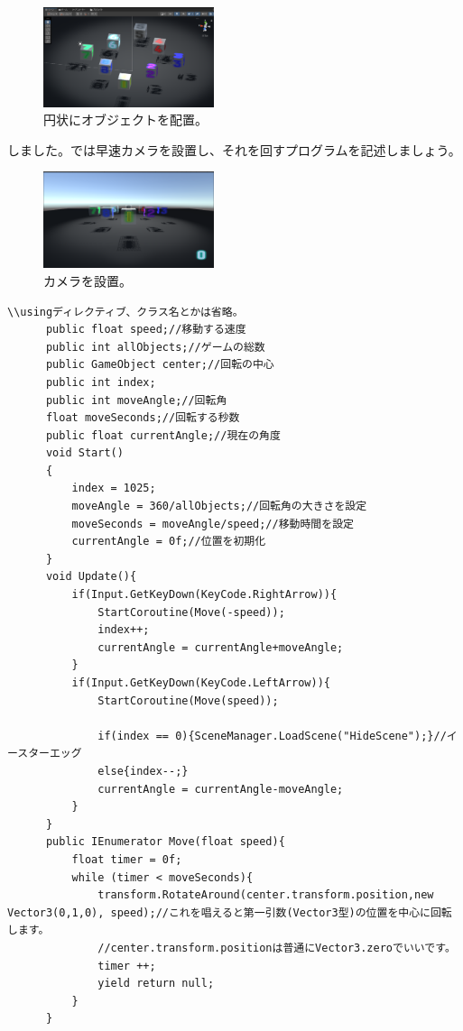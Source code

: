 \documentclass[b5paper,9pt,platex,dvipdfmx]{jsarticle}
\begin{document}
\begin{multicols}{3}
\begin{figure}[H]
  \centering
  \includegraphics[width=5cm]{2.png}
  \caption{円状にオブジェクトを配置。}
\end{figure}
しました。では早速カメラを設置し、それを回すプログラムを記述しましょう。\\
\begin{figure}[H]
  \centering
  \includegraphics[width=5cm]{3.png}
  \caption{カメラを設置。}
\end{figure}
\begin{lstlisting}[caption=MoveNext.cs]
\\usingディレクティブ、クラス名とかは省略。
      public float speed;//移動する速度
      public int allObjects;//ゲームの総数
      public GameObject center;//回転の中心
      public int index;
      public int moveAngle;//回転角
      float moveSeconds;//回転する秒数
      public float currentAngle;//現在の角度
      void Start()
      {
          index = 1025;
          moveAngle = 360/allObjects;//回転角の大きさを設定
          moveSeconds = moveAngle/speed;//移動時間を設定
          currentAngle = 0f;//位置を初期化
      }
      void Update(){
          if(Input.GetKeyDown(KeyCode.RightArrow)){
              StartCoroutine(Move(-speed));
              index++;
              currentAngle = currentAngle+moveAngle;
          }
          if(Input.GetKeyDown(KeyCode.LeftArrow)){
              StartCoroutine(Move(speed));

              if(index == 0){SceneManager.LoadScene("HideScene");}//イースターエッグ
              else{index--;}
              currentAngle = currentAngle-moveAngle;
          }
      }
      public IEnumerator Move(float speed){
          float timer = 0f;
          while (timer < moveSeconds){
              transform.RotateAround(center.transform.position,new Vector3(0,1,0), speed);//これを唱えると第一引数(Vector3型)の位置を中心に回転します。
              //center.transform.positionは普通にVector3.zeroでいいです。
              timer ++;
              yield return null;
          }
      }
\end{lstlisting}
\end{multicols}
\end{document}
